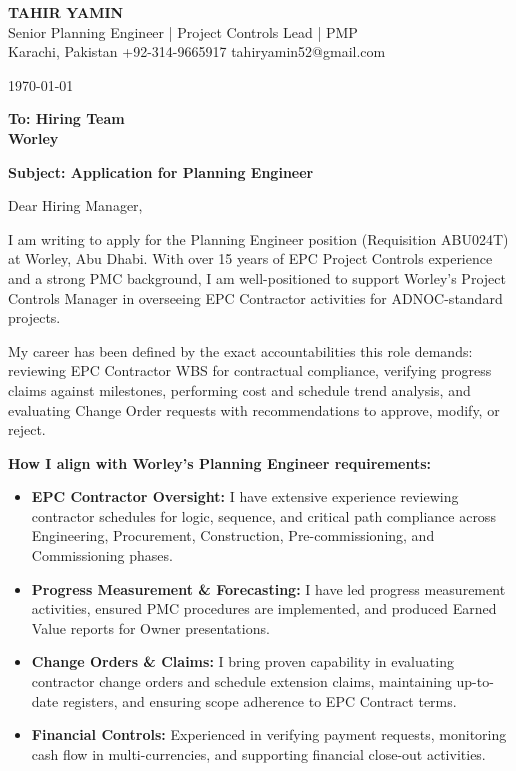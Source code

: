 \documentclass[11pt,a4paper]{article}
\begin{document}
\begin{center}
    {\Huge \textbf{\color{awesome-darknight} TAHIR YAMIN}} \\[0.2cm]
    {\Large \color{awesome-gray} Senior Planning Engineer | Project Controls Lead | PMP} \\[0.3cm]
    
    \small \color{light-gray}
    Karachi, Pakistan \quad \textbullet \quad 
    +92-314-9665917 \quad \textbullet \quad 
    tahiryamin52@gmail.com
\end{center}

\vspace{0.8cm}
\today
\vspace{0.5cm}

\textbf{To: Hiring Team} \\
\textbf{Worley} \\
\vspace{0.5cm}

\textbf{Subject: Application for Planning Engineer}

\vspace{0.5cm}

Dear Hiring Manager,

I am writing to apply for the Planning Engineer position (Requisition ABU024T) at Worley, Abu Dhabi. With over 15 years of EPC Project Controls experience and a strong PMC background, I am well-positioned to support Worley's Project Controls Manager in overseeing EPC Contractor activities for ADNOC-standard projects.

My career has been defined by the exact accountabilities this role demands: reviewing EPC Contractor WBS for contractual compliance, verifying progress claims against milestones, performing cost and schedule trend analysis, and evaluating Change Order requests with recommendations to approve, modify, or reject.

\textbf{How I align with Worley's Planning Engineer requirements:}
\begin{itemize}
    \item \textbf{EPC Contractor Oversight:} I have extensive experience reviewing contractor schedules for logic, sequence, and critical path compliance across Engineering, Procurement, Construction, Pre-commissioning, and Commissioning phases.
    \item \textbf{Progress Measurement \& Forecasting:} I have led progress measurement activities, ensured PMC procedures are implemented, and produced Earned Value reports for Owner presentations.
    \item \textbf{Change Orders \& Claims:} I bring proven capability in evaluating contractor change orders and schedule extension claims, maintaining up-to-date registers, and ensuring scope adherence to EPC Contract terms.
    \item \textbf{Financial Controls:} Experienced in verifying payment requests, monitoring cash flow in multi-currencies, and supporting financial close-out activities.
\end{itemize}
\end{document}

